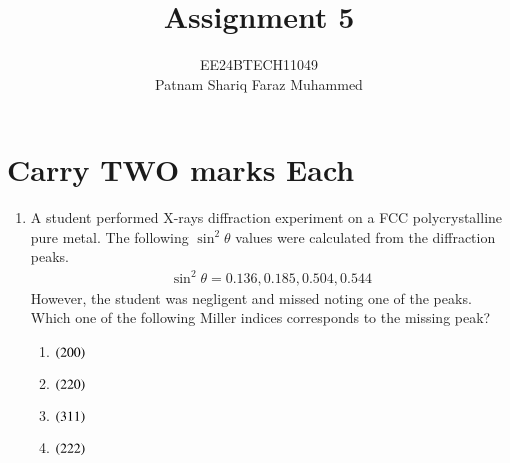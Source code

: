 \documentclass[journal]{IEEEtran}
\numberwithin{equation}{enumi}
\numberwithin{figure}{enumi}
\begin{document}


\title{Assignment 5}
\author{EE24BTECH11049 \\ Patnam Shariq Faraz Muhammed}

{\let\newpage\relax\maketitle}
\section{Carry TWO marks Each}
\begin{enumerate}
	\item A student performed X-rays diffraction experiment on a FCC polycrystalline pure metal. The following $\sin^{2}{\theta}$ values were calculated from the diffraction peaks. 
		\begin{align*}
			\sin^{2}{\theta} = 0.136, 0.185, 0.504, 0.544
		\end{align*}
	However, the student was negligent and missed noting one of the peaks. Which one of the following Miller indices corresponds to the missing peak? 
		
		\hfill{}

		\begin{multicols}{4}
			\begin{enumerate}
				\item $\left(200\right)$
				\item $\left(220\right)$
				\item $\left(311\right)$
				\item $\left(222\right)$
			\end{enumerate}
		\end{multicols}


\end{enumerate}
\end{document}
